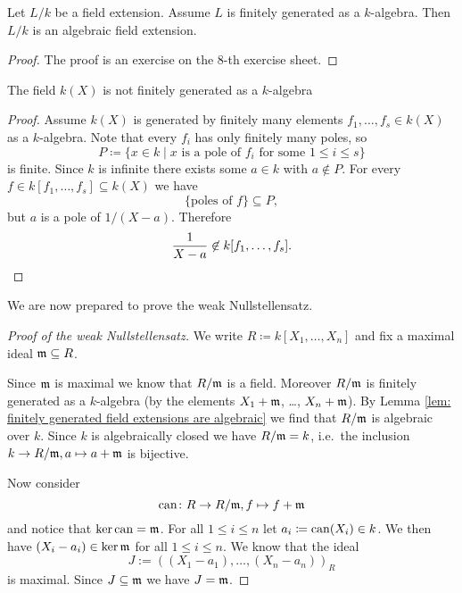 \begin{lem}\label{lem: finitely generated field extensions are algebraic}
 Let $L/k$ be a field extension. Assume $L$ is finitely generated as a $k$-algebra. Then $L/k$ is an algebraic field extension.
\end{lem}
\begin{proof}
 The proof is an exercise on the $8$-th exercise sheet.
\end{proof}


\begin{rem}
 The field $k(X)$ is not finitely generated as a $k$-algebra
 \begin{proof}
  Assume $k(X)$ is generated by finitely many elements $f_1, \dotsc, f_s \in k(X)$ as a $k$-algebra. Note that every $f_i$ has only finitely many poles, so
  \[
   P \coloneqq \{x \in k \mid \text{$x$ is a pole of $f_i$ for some $1 \leq i \leq s$}\}
  \]
  is finite. Since $k$ is infinite there exists some $a \in k$ with $a \not\in P$. For every $f \in k[f_1, \dotsc, f_s] \subseteq k(X)$ we have
  \[
   \{\text{poles of $f$}\} \subseteq P,
  \]
   but $a$ is a pole of $1/(X-a)$. Therefore
  \[
   \frac{1}{X-a} \not\in k[f_1, \dotsc, f_s].
   \qedhere
  \]
 \end{proof}
\end{rem}


We are now prepared to prove the weak Nullstellensatz.


\begin{proof}[Proof of the weak Nullstellensatz]
 We write $R \coloneqq k[X_1, \dotsc, X_n]$ and fix a maximal ideal $\mathfrak{m} \subseteq R$.
 
 Since $\mathfrak{m}$ is maximal we know that $R/\mathfrak{m}$ is a field. Moreover $R/\mathfrak{m}$ is finitely generated as a $k$-algebra (by the elements $X_1 + \mathfrak{m}$, \dots, $X_n + \mathfrak{m}$). By Lemma \ref{lem: finitely generated field extensions are algebraic} we find that $R/\mathfrak{m}$ is algebraic over $k$. Since $k$ is algebraically closed we have 
 $R/\mathfrak{m} = k$, i.e.\ the inclusion $k \to R/\mathfrak{m}, a \mapsto a+\mathfrak{m}$ is bijective.
 
 Now consider
 \[
  \operatorname{can} \colon R \to R/\mathfrak{m}, f \mapsto f + \mathfrak{m}
 \]
 and notice that $\ker \operatorname{can} = \mathfrak{m}$. For all $1 \leq i \leq n$ let $a_i \coloneqq \operatorname{can}(X_i) \in k$. We then have $(X_i - a_i) \in \ker \mathfrak{m}$ for all $1 \leq i \leq n$. We know that the ideal
 \[
  J := ((X_1 - a_1), \dotsc, (X_n - a_n))_R
 \]
 is maximal. Since $J \subseteq \mathfrak{m}$ we have $J = \mathfrak{m}$.
\end{proof}


